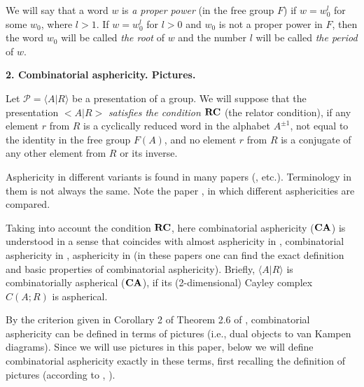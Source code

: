 \documentclass[12pt,reqno]{amsart}
\begin{document}
We will say that a word $w$ is {\it a proper power} (in the free group $F$) if $w=w_0^l$ for some $w_0$, where $l>1$. If $w=w_0^l$ for $l>0$ and $w_0$ is not a proper power in $F$, then the word $w_0$ will be called  {\it the root} of $w$ and the number $l$ will be called {\it the period} of $w$.

\vspace{3mm}

{\bf 2. Combinatorial asphericity. Pictures.}

Let $\mathcal{P}=\langle A|R\rangle$ be a presentation of a group. We will suppose that the presentation $<A|R>$ {\it satisfies the condition} $\bf RC$ (the relator condition), if any element $r$ from $R$ is a cyclically reduced word in the alphabet $A^{\pm 1}$, not equal to the identity in the free group $F(A)$, and no element $r$ from $R$  is a conjugate of any other element from $R$ or its inverse.

 Asphericity in different variants is found in many papers (\cite{chiswell,lind,sieradski,olsh,pride,gener_b_pr,ratcl}, etc.). Terminology in them is not always the same.  Note the paper \cite{chiswell}, in which different asphericities are compared. 

  Taking into account the condition $\bf RC$, here combinatorial asphericity ($\bf CA$) is understood in a sense that coincides with almost asphericity in \cite{ratcl}, combinatorial asphericity in \cite{chiswell,pride}, asphericity in \cite{huebschmann} (in these papers one can find the exact definition and basic properties of combinatorial asphericity). Briefly, $\langle A|R\rangle$ is combinatorially aspherical ($\bf CA$), if its (2-dimensional) Cayley complex $C(A;R)$ is aspherical.

   By the criterion given in Corollary 2 of Theorem 2.6 of \cite{pride}, combinatorial asphericity can be defined in terms of pictures (i.e., dual objects to van Kampen diagrams). Since we will use pictures in this paper,  below we will define combinatorial asphericity exactly in these terms, first recalling the definition of pictures (according to \cite{gener_b_pr}, \cite{pride}).
\end{document}
